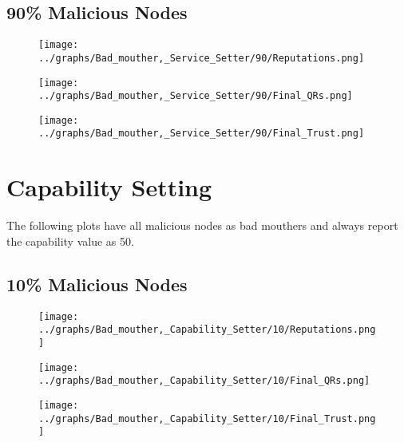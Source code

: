\documentclass{article}
\begin{document}
    \begin{minipage}[t]{0.49\columnwidth}
    \subsection*{90\% Malicious Nodes}
        \begin{figure}[H]
            \centering
            \texttt{[image: ../graphs/Bad\_mouther,\_Service\_Setter/90/Reputations.png]}
        \end{figure}
        \begin{figure}[H]
            \centering
            \texttt{[image: ../graphs/Bad\_mouther,\_Service\_Setter/90/Final\_QRs.png]}
        \end{figure}
    \end{minipage}
    \begin{minipage}[t]{0.49\columnwidth}
        \begin{figure}[H]
            \centering
            \texttt{[image: ../graphs/Bad\_mouther,\_Service\_Setter/90/Final\_Trust.png]}
        \end{figure}
    \end{minipage}
    \newpage

    \section*{Capability Setting}
    The following plots have all malicious nodes as bad mouthers and always
    report the capability value as 50.
    \\
  \begin{minipage}[t]{0.49\columnwidth}
    \subsection*{10\% Malicious Nodes}
        \begin{figure}[H]
            \centering
            \texttt{[image: ../graphs/Bad\_mouther,\_Capability\_Setter/10/Reputations.png]}
        \end{figure}
        \begin{figure}[H]
            \centering
            \texttt{[image: ../graphs/Bad\_mouther,\_Capability\_Setter/10/Final\_QRs.png]}
        \end{figure}
    \end{minipage}
    \begin{minipage}[t]{0.49\columnwidth}
        \begin{figure}[H]
            \centering
            \texttt{[image: ../graphs/Bad\_mouther,\_Capability\_Setter/10/Final\_Trust.png]}
        \end{figure}
    \end{minipage}
\end{document}

